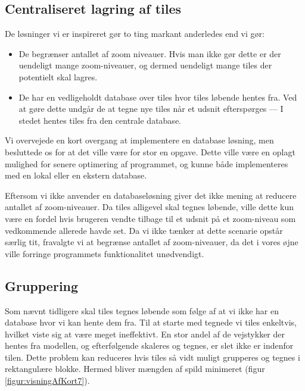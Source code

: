 \subsection{Centraliseret lagring af tiles}
\label{subsec:centraliseretLagringAfTiles}

De løsninger vi er inspireret gør to ting markant anderledes end vi gør:

\begin{itemize}
	\item De begrænser antallet af zoom niveauer. Hvis man ikke gør dette er der uendeligt mange zoom-niveauer, og dermed uendeligt mange tiles der potentielt skal lagres.
	\item De har en vedligeholdt database over tiles hvor tiles løbende hentes fra. Ved at gøre dette undgår de at tegne nye tiles når et udsnit efterspørges --- I stedet hentes tiles fra den centrale database.
\end{itemize}

Vi overvejede en kort overgang at implementere en database løsning, men besluttede os for at det ville være for stor en opgave. Dette ville være en oplagt mulighed for senere optimering af programmet, og kunne både implementeres med en lokal eller en ekstern database.

Eftersom vi ikke anvender en databaseløsning giver det ikke mening at reducere antallet af zoom-niveauer. Da tiles alligevel skal tegnes løbende, ville dette kun være en fordel hvis brugeren vendte tilbage til et udsnit på et zoom-niveau som vedkommende allerede havde set. Da vi ikke tænker at dette scenarie opstår særlig tit, fravalgte vi at begrænse antallet af zoom-niveauer, da det i vores øjne ville forringe programmets funktionalitet unødvendigt.

\subsection{Gruppering}
\label{subsec:gruppering}

Som nævnt tidligere skal tiles tegnes løbende som følge af at vi ikke har en database hvor vi kan hente dem fra. Til at starte med tegnede vi tiles enkeltvis, hvilket viste sig at være meget ineffektivt. En stor andel af de vejstykker der hentes fra modellen, og efterfølgende skaleres og tegnes, er slet ikke er indenfor tilen. Dette problem kan reduceres hvis tiles så vidt muligt grupperes og tegnes i rektangulære blokke. Hermed bliver mængden af spild minimeret (figur \ref{figur:visningAfKort7}).

